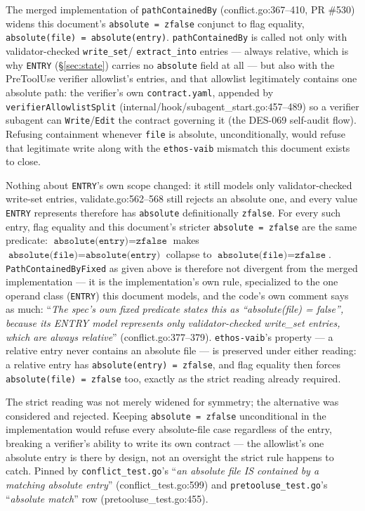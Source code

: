 \documentclass[a4paper,10pt,fleqn]{article}
\newcommand{\field}[1]{\texttt{#1}}
\begin{document}
The merged implementation of \field{pathContainedBy}
(conflict.go:367--410, PR \#530) widens this document's
\field{absolute = zfalse} conjunct to flag equality,
\field{absolute(file) = absolute(entry)}. \field{pathContainedBy} is
called not only with validator-checked \field{write\_set}/
\field{extract\_into} entries --- always relative, which is why
\field{ENTRY} (\S\ref{sec:state}) carries no \field{absolute} field
at all --- but also with the PreToolUse verifier allowlist's entries,
and that allowlist legitimately contains one absolute path: the
verifier's own \field{contract.yaml}, appended by
\field{verifierAllowlistSplit} (internal/hook/subagent\_start.go:457--489)
so a verifier subagent can \field{Write}/\field{Edit} the contract
governing it (the DES-069 self-audit flow). Refusing containment
whenever \field{file} is absolute, unconditionally, would refuse that
legitimate write along with the \field{ethos-vaib} mismatch this
document exists to close.

Nothing about \field{ENTRY}'s own scope changed: it still models only
validator-checked write-set entries, validate.go:562--568 still
rejects an absolute one, and every value \field{ENTRY} represents
therefore has \field{absolute} definitionally \field{zfalse}. For
every such entry, flag equality and this document's stricter
\field{absolute = zfalse} are the same predicate:
$\field{absolute(entry)} = \field{zfalse}$ makes
$\field{absolute(file)} = \field{absolute(entry)}$ collapse to
$\field{absolute(file)} = \field{zfalse}$. \field{PathContainedByFixed}
as given above is therefore not divergent from the merged
implementation --- it is the implementation's own rule, specialized to
the one operand class (\field{ENTRY}) this document models, and the
code's own comment says as much: ``\emph{The spec's own fixed
predicate states this as ``absolute(file) = false'', because its
ENTRY model represents only validator-checked write\_set entries,
which are always relative}'' (conflict.go:377--379).
\field{ethos-vaib}'s property --- a relative entry never contains an
absolute file --- is preserved under either reading: a relative entry
has \field{absolute(entry) = zfalse}, and flag equality then forces
\field{absolute(file) = zfalse} too, exactly as the strict reading
already required.

The strict reading was not merely widened for symmetry; the
alternative was considered and rejected. Keeping
\field{absolute = zfalse} unconditional in the implementation would
refuse every absolute-file case regardless of the entry, breaking a
verifier's ability to write its own contract --- the allowlist's one
absolute entry is there by design, not an oversight the strict rule
happens to catch. Pinned by \field{conflict\_test.go}'s ``\emph{an
absolute file IS contained by a matching absolute entry}''
(conflict\_test.go:599) and \field{pretooluse\_test.go}'s ``\emph{absolute
match}'' row (pretooluse\_test.go:455).
\end{document}
